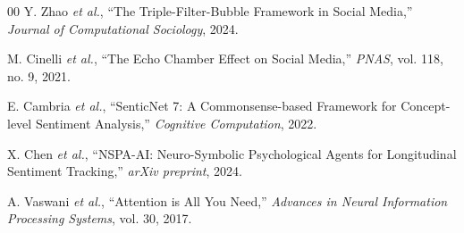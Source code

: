 \documentclass[12pt]{IEEEtran}
\begin{document}
\begin{thebibliography}{00}
Y. Zhao \textit{et al.}, ``The Triple-Filter-Bubble Framework in Social Media,'' \textit{Journal of Computational Sociology}, 2024.

M. Cinelli \textit{et al.}, ``The Echo Chamber Effect on Social Media,'' \textit{PNAS}, vol. 118, no. 9, 2021.

E. Cambria \textit{et al.}, ``SenticNet 7: A Commonsense-based Framework for Concept-level Sentiment Analysis,'' \textit{Cognitive Computation}, 2022.

X. Chen \textit{et al.}, ``NSPA-AI: Neuro-Symbolic Psychological Agents for Longitudinal Sentiment Tracking,'' \textit{arXiv preprint}, 2024.

A. Vaswani \textit{et al.}, ``Attention is All You Need,'' \textit{Advances in Neural Information Processing Systems}, vol. 30, 2017.

\end{thebibliography}
\end{document}
